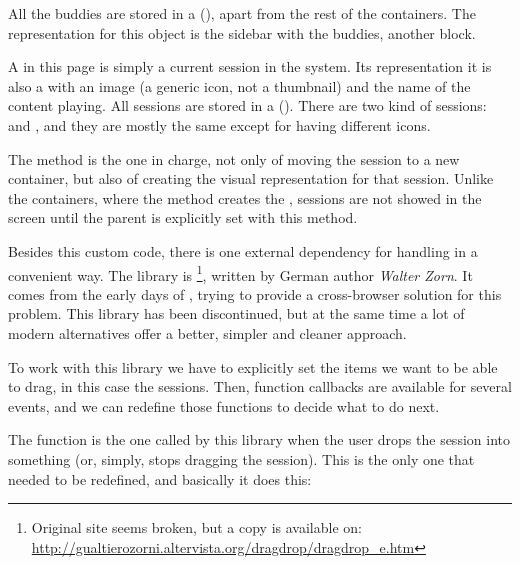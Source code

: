 All the buddies are stored in a  (), apart from the rest of the containers.
The  representation for this object is the sidebar with the buddies, another  block.

A  in this page is simply a current session in the system.
Its  representation it is also a  with an image (a generic icon, not a thumbnail) and the name of the content playing.
All sessions are stored in a  ().
There are two kind of sessions:  and , and they are mostly the same except for having different icons.

The  method is the one in charge, not only of moving the session to a new container, but also of creating the visual representation for that session.
Unlike the containers, where the  method creates the , sessions are not showed in the screen until the parent is explicitly set with this  method.

Besides this custom code, there is one external dependency for handling  in a convenient way.
The library is \footnote{Original site seems broken, but a copy is available on:\\ \url{http://gualtierozorni.altervista.org/dragdrop/dragdrop_e.htm}}, written by German author \emph{Walter Zorn}.
It comes from the early days of , trying to provide a cross-browser solution for this problem.
This library has been discontinued, but at the same time a lot of modern alternatives offer a better, simpler and cleaner approach.

To work with this library we have to explicitly set the items we want to be able to drag, in this case the sessions.
Then, function callbacks are available for several events, and we can redefine those functions to decide what to do next.

The  function is the one called by this library when the user drops the session into something (or, simply, stops dragging the session).
This is the only one that needed to be redefined, and basically it does this:

